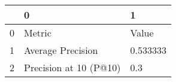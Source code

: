 \begin{tabular}{lll}
\toprule
{} &                       0 &         1 \\
\midrule
0 &                  Metric &     Value \\
1 &       Average Precision &  0.533333 \\
2 &  Precision at 10 (P@10) &       0.3 \\
\bottomrule
\end{tabular}
